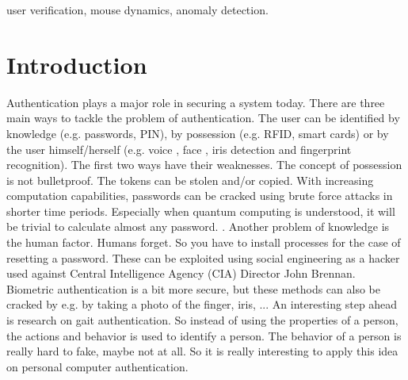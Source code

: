\documentclass[conference]{IEEEtran}
\begin{document}
\begin{IEEEkeywords}
user verification, mouse dynamics, anomaly detection.
\end{IEEEkeywords}






%
\IEEEpeerreviewmaketitle



\section{Introduction}

Authentication plays a major role in securing a system today. There are three main ways to tackle the problem of authentication. The user can be identified by knowledge (e.g. passwords, PIN), by possession (e.g. RFID, smart cards) or by the user himself/herself (e.g. voice \cite{kennedy2000radio}, face \cite{mallauran2005online}, iris \cite{chong2005iris} detection and fingerprint \cite{gupta2005efficient} recognition). \cite{pusara2004user} The first two ways have their weaknesses. The concept of possession is not bulletproof. The tokens can be stolen and/or copied.
With increasing computation capabilities, passwords can be cracked using brute force attacks in shorter time periods. Especially when quantum computing is understood, it will be trivial to calculate almost any password. \cite{steane1998quantum}. Another problem of knowledge is the human factor. Humans forget. So you have to install processes for the case of resetting a password. These can be exploited using social engineering as a hacker used against Central Intelligence Agency (CIA) Director John Brennan. \cite{wiredSocialEng} Biometric authentication is a bit more secure, but these methods can also be cracked by e.g. by taking a photo of the finger, iris, ...
An interesting step ahead is research on gait authentication. \cite{gafurov2006biometric} So instead of using the properties of a person, the actions and behavior is used to identify a person. The behavior of a person is really hard to fake, maybe not at all.
So it is really interesting to apply this idea on personal computer authentication.
\end{document}
